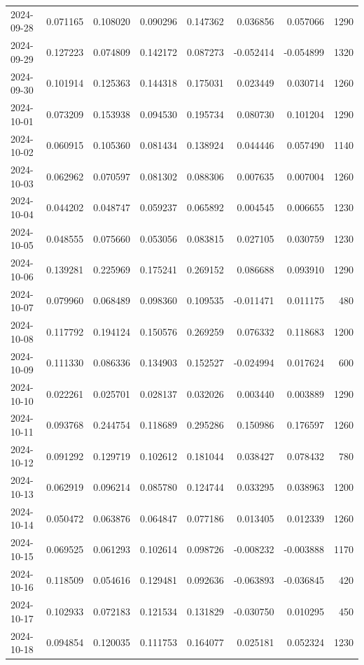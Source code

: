 \begin{tabular}{lrrrrrrr}
2024-09-28 & 0.071165 & 0.108020 & 0.090296 & 0.147362 & 0.036856 & 0.057066 & 1290 \\
2024-09-29 & 0.127223 & 0.074809 & 0.142172 & 0.087273 & -0.052414 & -0.054899 & 1320 \\
2024-09-30 & 0.101914 & 0.125363 & 0.144318 & 0.175031 & 0.023449 & 0.030714 & 1260 \\
2024-10-01 & 0.073209 & 0.153938 & 0.094530 & 0.195734 & 0.080730 & 0.101204 & 1290 \\
2024-10-02 & 0.060915 & 0.105360 & 0.081434 & 0.138924 & 0.044446 & 0.057490 & 1140 \\
2024-10-03 & 0.062962 & 0.070597 & 0.081302 & 0.088306 & 0.007635 & 0.007004 & 1260 \\
2024-10-04 & 0.044202 & 0.048747 & 0.059237 & 0.065892 & 0.004545 & 0.006655 & 1230 \\
2024-10-05 & 0.048555 & 0.075660 & 0.053056 & 0.083815 & 0.027105 & 0.030759 & 1230 \\
2024-10-06 & 0.139281 & 0.225969 & 0.175241 & 0.269152 & 0.086688 & 0.093910 & 1290 \\
2024-10-07 & 0.079960 & 0.068489 & 0.098360 & 0.109535 & -0.011471 & 0.011175 & 480 \\
2024-10-08 & 0.117792 & 0.194124 & 0.150576 & 0.269259 & 0.076332 & 0.118683 & 1200 \\
2024-10-09 & 0.111330 & 0.086336 & 0.134903 & 0.152527 & -0.024994 & 0.017624 & 600 \\
2024-10-10 & 0.022261 & 0.025701 & 0.028137 & 0.032026 & 0.003440 & 0.003889 & 1290 \\
2024-10-11 & 0.093768 & 0.244754 & 0.118689 & 0.295286 & 0.150986 & 0.176597 & 1260 \\
2024-10-12 & 0.091292 & 0.129719 & 0.102612 & 0.181044 & 0.038427 & 0.078432 & 780 \\
2024-10-13 & 0.062919 & 0.096214 & 0.085780 & 0.124744 & 0.033295 & 0.038963 & 1200 \\
2024-10-14 & 0.050472 & 0.063876 & 0.064847 & 0.077186 & 0.013405 & 0.012339 & 1260 \\
2024-10-15 & 0.069525 & 0.061293 & 0.102614 & 0.098726 & -0.008232 & -0.003888 & 1170 \\
2024-10-16 & 0.118509 & 0.054616 & 0.129481 & 0.092636 & -0.063893 & -0.036845 & 420 \\
2024-10-17 & 0.102933 & 0.072183 & 0.121534 & 0.131829 & -0.030750 & 0.010295 & 450 \\
2024-10-18 & 0.094854 & 0.120035 & 0.111753 & 0.164077 & 0.025181 & 0.052324 & 1230 \\

\end{tabular}
